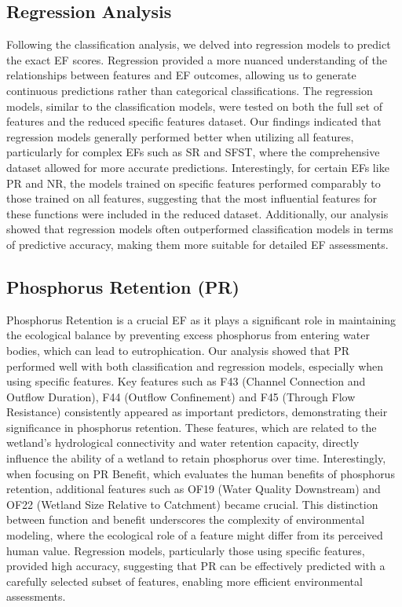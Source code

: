 \documentclass[12pt,letterpaper]{article}
\begin{document}
\subsection{Regression Analysis}
Following the classification analysis, we delved into regression models to predict the exact \ac{EF} scores.
Regression provided a more nuanced understanding of the relationships between features and \ac{EF} outcomes, allowing us to generate continuous predictions rather than categorical classifications.
The regression models, similar to the classification models, were tested on both the full set of features and the reduced specific features dataset.
Our findings indicated that regression models generally performed better when utilizing all features, particularly for complex \acp{EF} such as \ac{SR} and \ac{SFST}, where the comprehensive dataset allowed for more accurate predictions.
Interestingly, for certain \acp{EF} like \ac{PR} and \ac{NR}, the models trained on specific features performed comparably to those trained on all features, suggesting that the most influential features for these functions were included in the reduced dataset.
Additionally, our analysis showed that regression models often outperformed classification models in terms of predictive accuracy, making them more suitable for detailed \ac{EF} assessments.


\subsection{Phosphorus Retention (\ac{PR})}
Phosphorus Retention is a crucial \ac{EF} as it plays a significant role in maintaining the ecological balance by preventing excess phosphorus from entering water bodies, which can lead to eutrophication.
Our analysis showed that \ac{PR} performed well with both classification and regression models, especially when using specific features.
Key features such as F43 (Channel Connection and Outflow Duration), F44 (Outflow Confinement) and F45 (Through Flow Resistance) consistently appeared as important predictors, demonstrating their significance in phosphorus retention.
These features, which are related to the wetland's hydrological connectivity and water retention capacity, directly influence the ability of a wetland to retain phosphorus over time.
Interestingly, when focusing on \ac{PR} Benefit, which evaluates the human benefits of phosphorus retention, additional features such as OF19 (Water Quality Downstream) and OF22 (Wetland Size Relative to Catchment) became crucial.
This distinction between function and benefit underscores the complexity of environmental modeling, where the ecological role of a feature might differ from its perceived human value.
Regression models, particularly those using specific features, provided high accuracy, suggesting that \ac{PR} can be effectively predicted with a carefully selected subset of features, enabling more efficient environmental assessments.
\end{document}
